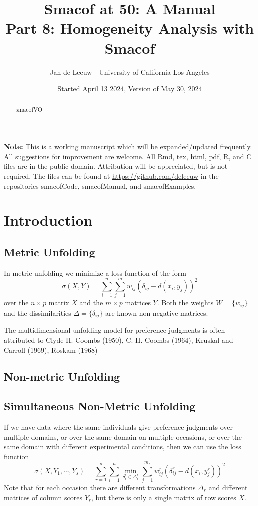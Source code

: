 \documentclass[
  12pt,
]{article}
\title{Smacof at 50: A Manual\\
Part 8: Homogeneity Analysis with Smacof}
\author{Jan de Leeuw - University of California Los Angeles}
\date{Started April 13 2024, Version of May 30, 2024}
\begin{document}
\maketitle
\begin{abstract}
smacofVO
\end{abstract}

{
\setcounter{tocdepth}{3}
\tableofcontents
}
\textbf{Note:} This is a working manuscript which will be expanded/updated
frequently. All suggestions for improvement are welcome. All Rmd, tex,
html, pdf, R, and C files are in the public domain. Attribution will be
appreciated, but is not required. The files can be found at
\url{https://github.com/deleeuw} in the repositories smacofCode, smacofManual,
and smacofExamples.

\section{Introduction}\label{introduction}

\subsection{Metric Unfolding}\label{metric-unfolding}

In metric unfolding we minimize a loss function of the form
\begin{equation}
\sigma(X,Y)=\sum_{i=1}^n\sum_{j=1}^mw_{ij}(\delta_{ij}-d(x_i,y_j))^2
\end{equation}
over the \(n\times p\) matrix \(X\) and the \(m\times p\) matrices \(Y\). Both
the weights \(W=\{w_{ij}\}\) and the dissimilarities \(\Delta=\{\delta_{ij}\}\)
are known non-negative matrices.

The multidimensional unfolding model for preference judgments is often attributed to Clyde H. Coombs (1950), C. H. Coombs (1964), Kruskal and Carroll (1969), Roskam (1968)

\subsection{Non-metric Unfolding}\label{non-metric-unfolding}

\subsection{Simultaneous Non-Metric Unfolding}\label{simultaneous-non-metric-unfolding}

If we have data where the same individuals give preference
judgments over multiple domains, or over the same domain on multiple occasions, or over the same domain with different experimental conditions,
then we can use the loss function
\[
\sigma(X,Y_1,\cdots,Y_s)=\sum_{r=1}^s\sum_{i=1}^n\min_{\delta_i^r\in\Delta_i^r}\sum_{j=1}^{m_r}w_{ij}^r(\delta_{ij}^r-d(x_i,y_j^r))^2
\]
Note that for each occasion there are different transformations \(\Delta_r\)
and different matrices of column scores \(Y_r\), but there is only a single matrix of row scores \(X\).
\end{document}
